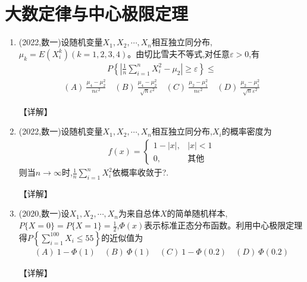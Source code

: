 \documentclass[12pt, a4paper, oneside, UTF8]{ctexbook}
\begin{document}
% 
\else
\fi

\chapter{大数定律与中心极限定理}

\begin{enumerate}[label=\arabic*.]
    \item (2022,数一)设随机变量$X_1,X_2,\cdots,X_n$相互独立同分布,$\mu_k=E(X_i^k)(k=1,2,3,4)$。由切比雪夫不等式,对任意$\varepsilon>0$,有
    \begin{align*}
        P\left\{\left|\frac{1}{n}\sum_{i=1}^n X_i^2-\mu_2\right|\geq\varepsilon\right\}\leq
    \end{align*}
    \begin{align*}
        (A)\ \frac{\mu_4-\mu_2^2}{n\varepsilon^2} \quad (B)\ \frac{\mu_4-\mu_2^2}{\sqrt{n}\varepsilon^2} \quad (C)\ \frac{\mu_2-\mu_1^2}{n\varepsilon^2} \quad (D)\ \frac{\mu_2-\mu_1^2}{\sqrt{n}\varepsilon^2}
    \end{align*}
    
    \begin{solution}
    【详解】
    \end{solution}
    
    \item (2022,数一)设随机变量$X_1,X_2,\cdots,X_n$相互独立同分布,$X_i$的概率密度为
    \begin{align*}
        f(x)=\begin{cases}
            1-|x|, & |x|<1 \\
            0, & \text{其他}
        \end{cases}
    \end{align*}
    则当$n\rightarrow\infty$时,$\frac{1}{n}\sum_{i=1}^n X_i^2$依概率收敛于?.
    
    \begin{solution}
    【详解】
    \end{solution}
    
    \item (2020,数一)设$X_1,X_2,\cdots,X_n$为来自总体$X$的简单随机样本,$P\{X=0\}=P\{X=1\}=\frac{1}{2}$,$\Phi(x)$表示标准正态分布函数。利用中心极限定理得$P\left\{\sum_{i=1}^{100} X_i\leq 55\right\}$的近似值为
    \begin{align*}
        (A)\ 1-\Phi(1) \quad (B)\ \Phi(1) \quad (C)\ 1-\Phi(0.2) \quad (D)\ \Phi(0.2)
    \end{align*}
    
    \begin{solution}
    【详解】
    \end{solution}
\end{enumerate}

\ifx\allfiles\undefined
\end{document}
